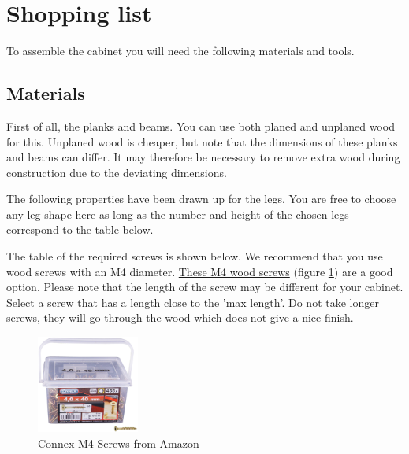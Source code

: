 \documentclass{article}
\begin{document}
\section{Shopping list}

To assemble the cabinet you will need the following materials and tools. \\

\subsection{Materials}

First of all, the planks and beams. You can use both planed and unplaned wood for this. Unplaned wood is cheaper, but note that the dimensions of these planks and beams can differ. It may therefore be necessary to remove extra wood during construction due to the deviating dimensions.



The following properties have been drawn up for the legs. You are free to choose any leg shape here as long as the number and height of the chosen legs correspond to the table below.



The table of the required screws is shown below. We recommend that you use wood screws with an M4 diameter. \href{https://www.amazon.nl/gp/product/B00B214ZLQ/ref=ppx_yo_dt_b_asin_title_o07_s00?ie=UTF8&psc=1}{These M4 wood screws} (figure \ref{fig:schroeven}) are a good option. Please note that the length of the screw may be different for your cabinet. Select a screw that has a length close to the 'max length'. Do not take longer screws, they will go through the wood which does not give a nice finish.



\begin{figure}[h!]
    \centering
    \includegraphics[width=0.3\textwidth]{schroeven.png}
    \caption{Connex M4 Screws from Amazon}
    \label{fig:schroeven}
\end{figure}

\clearpage
\newpage
\end{document}
